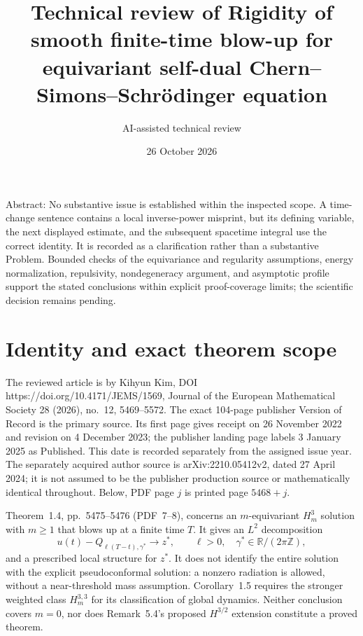 \documentclass[10pt]{article}
\title{Technical review of
Rigidity of smooth finite-time blow-up for equivariant self-dual Chern–Simons–Schrödinger equation}
\author{AI-assisted technical review}
\date{26 October 2026}
\begin{document}
\maketitle
Abstract: No substantive issue is established within the inspected scope. A time-change sentence contains a local inverse-power misprint, but its defining variable, the next displayed estimate, and the subsequent spacetime integral use the correct identity. It is recorded as a clarification rather than a substantive Problem. Bounded checks of the equivariance and regularity assumptions, energy normalization, repulsivity, nondegeneracy argument, and asymptotic profile support the stated conclusions within explicit proof-coverage limits; the scientific decision remains pending.\par
\section*{Identity and exact theorem scope}
The reviewed article is by Kihyun Kim, DOI https://doi.org/10.4171/JEMS/1569, Journal of the European Mathematical Society 28 (2026), no. 12, 5469–5572. The exact 104-page publisher Version of Record is the primary source. Its first page gives receipt on 26 November 2022 and revision on 4 December 2023; the publisher landing page labels 3 January 2025 as Published. This date is recorded separately from the assigned issue year. The separately acquired author source is arXiv:2210.05412v2, dated 27 April 2024; it is not assumed to be the publisher production source or mathematically identical throughout. Below, PDF page \(j\) is printed page \(5468+j\).\par
Theorem 1.4, pp. 5475–5476 (PDF 7–8), concerns an \(m\)-equivariant \(H_m^3\) solution with \(m\ge1\) that blows up at a finite time \(T\). It gives an \(L^2\) decomposition \[u(t)-Q_{\ell(T-t),\gamma^*}\longrightarrow z^*,\qquad
\ell>0,\quad \gamma^*\in\mathbb R/(2\pi\mathbb Z),\] and a prescribed local structure for \(z^*\). It does not identify the entire solution with the explicit pseudoconformal solution: a nonzero radiation is allowed, without a near-threshold mass assumption. Corollary 1.5 requires the stronger weighted class \(H_m^{3,3}\) for its classification of global dynamics. Neither conclusion covers \(m=0\), nor does Remark 5.4’s proposed \(H^{3/2}\) extension constitute a proved theorem.\par
\end{document}
